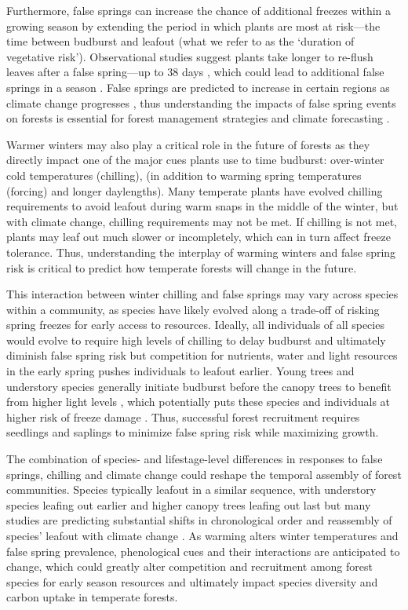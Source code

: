 \documentclass{article}\usepackage[]{graphicx}\usepackage[]{color}
\begin{document}
Furthermore, false springs can increase the chance of additional freezes within a growing season by extending the period in which plants are most at risk---the time between budburst and leafout (what we refer to as the `duration of vegetative risk'). Observational studies suggest plants take longer to re-flush leaves after a false spring---up to 38 days \citep{Augspurger2009, Augspurger2013, Gu2008, Menzel2015}, which could lead to additional false springs in a season \citep{Augspurger2009}. False springs are predicted to increase in certain regions as climate change progresses \citep{Ault2015, Liu2018, Zohner2020}, thus understanding the impacts of false spring events on forests is essential for forest management strategies and climate forecasting \citep{OBrien2019}.
  
Warmer winters may also play a critical role in the future of forests as they directly impact one of the  major cues plants use to time budburst: over-winter cold temperatures (chilling), (in addition to warming spring temperatures (forcing) and longer daylengths). Many temperate plants have evolved chilling requirements to avoid leafout during warm snaps in the middle of the winter, but with climate change, chilling requirements may not be met. If chilling is not met, plants may leaf out much slower or incompletely, which can in turn affect freeze tolerance. Thus, understanding the interplay of warming winters and false spring risk is critical to predict how temperate forests will change in the future.
  
This interaction between winter chilling and false springs may vary across species within a community, as species have likely evolved along a trade-off of risking spring freezes for early access to resources. Ideally, all individuals of all species would evolve to require high levels of chilling to delay budburst and ultimately diminish false spring risk but competition for nutrients, water and light resources in the early spring pushes individuals to leafout earlier. Young trees and understory species generally initiate budburst before the canopy trees to benefit from higher light levels \citep {Augspurger2008, Vitasse2013}, which potentially puts these species and individuals at higher risk of freeze damage \citep{Vitasse2014}. Thus, successful forest recruitment requires seedlings and saplings to minimize false spring risk while maximizing growth.
 
The combination of species- and lifestage-level differences in responses to false springs, chilling and climate change could reshape the temporal assembly of forest communities. Species typically leafout in a similar sequence, with understory species leafing out earlier and higher canopy trees leafing out last but many studies are predicting substantial shifts in chronological order and reassembly of species' leafout with climate change \citep{Roberts2015, Laube2014}. As warming alters winter temperatures and false spring prevalence, phenological cues and their interactions are anticipated to change, which could greatly alter competition and recruitment among forest species for early season resources and ultimately impact species diversity and carbon uptake in temperate forests.
  
\end{document}
